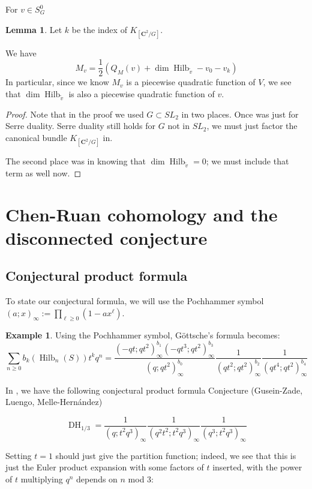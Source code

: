 \documentclass{amsart}[12pt]
\theoremstyle{definition}
\newtheorem{lemma}[dummy]{Lemma}
\newtheorem{example}[dummy]{Example}
\newcommand{\C}{\mathbf{C}}
\DeclareMathOperator{\Hilb}{Hilb}
\DeclareMathOperator{\DC}{DH}
\begin{document}
For $v\in S^0_G$

\begin{lemma}
Let $k$ be the index of $K_{[\C^2/G]}$.

We have
$$M_v=\frac{1}{2}\left(Q_M(v)+\dim\Hilb_{\tilde{v}} -v_0-v_k\right)$$
In particular, since we know $M_v$ is a piecewise quadratic function of $V$, we see that $\dim\Hilb_{\tilde{v}}$ is also a piecewise quadratic function of $v$.

\end{lemma}

\begin{proof}
Note that in the proof we used $G\subset SL_2$ in two places.  Once was just for Serre duality.  Serre duality still holds for $G$ not in $SL_2$, we must just factor the canonical bundle $K_{[\C^2/G]}$ in.

The second place was in knowing that $\dim \Hilb_{\tilde{v}}=0$; we must include that term as well now.

\end{proof}
\section{Chen-Ruan cohomology and the disconnected conjecture}


\subsection{Conjectural product formula}

To state our conjectural formula, we will use the Pochhammer symbol $(a;x)_\infty:=\prod_{\ell\geq 0} (1-ax^\ell)$.
\begin{example}
Using the Pochhammer symbol, G\"ottsche's formula becomes:
$$\sum_{n\geq 0} b_k(\Hilb_n(S))t^kq^n=\frac{(-qt;qt^2)_\infty^{b_1}(-qt^3;qt^2)_\infty^{b_3}}{(q;qt^2)_\infty^{b_0}}\frac{1}{(qt^2;qt^2)_\infty^{b_2}}\frac{1}{(qt^4;qt^2)_\infty^{b_4}}$$
\end{example}

In \cite{GLMequivariant}, we have the following conjectural product formula 
{Conjecture (Gusein-Zade, Luengo, Melle-Hern\'andez)}

$$\DC_{1/3}=\frac{1}{(q;t^2q^3)_\infty}\frac{1}{(q^2t^2;t^2q^3)_\infty}\frac{1}{(q^3;t^2q^3)_\infty}$$

Setting $t=1$ should just give the partition function; indeed, we see that this is just the Euler product expansion with some factors of $t$ inserted, with the power of $t$ multiplying $q^n$ depends on $n$ mod 3:
\end{document}
